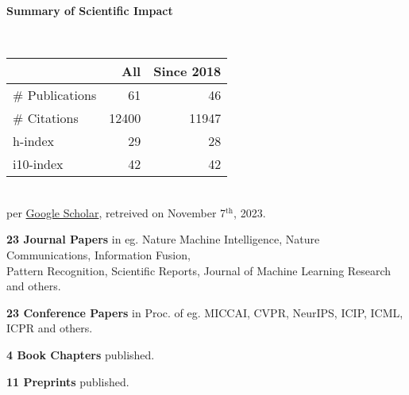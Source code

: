 \headedsection %
{\bf Summary of Scientific Impact}{}{}
{
    \qquad~~~~
    \begin{minipage}[t]{0.6\textwidth}
        \begin{tabular}{lrr}
        \hline
         & All & Since 2018\\
        \hline
        \# Publications & 61     & 46    \\
        \# Citations    & 12400  & 11947 \\
        h-index         & 29     & 28    \\
        i10-index       & 42     & 42    \\
        \hline
    \end{tabular}
    \\
    {\footnotesize{
        per \href{https://scholar.google.com/citations?user=wpLQuroAAAAJ}{Google Scholar},
        retreived on November 7$^\text{th}$, 2023.
        }
    }
    \end{minipage}

    \ifdefined\shortcv
        \vstep
        {\bf 23 Journal Papers} in eg. Nature Machine Intelligence, Nature Communications, Information Fusion,\\
        \hspace*{\fill} Pattern Recognition, Scientific Reports, Journal of Machine Learning Research and others.

        {\bf 23 Conference Papers} in Proc. of eg. MICCAI, CVPR, NeurIPS, ICIP, ICML, ICPR and others.

        {\bf 4 Book Chapters} published.

        {\bf 11 Preprints} published.
        
    \else
        {}
    \fi

}
